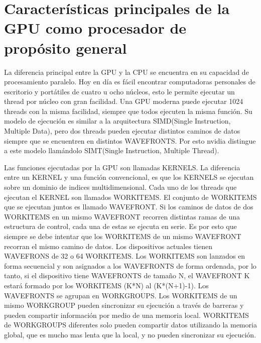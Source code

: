 
\chapter{Características principales de la GPU como procesador de propósito
general}

La diferencia principal entre la GPU y la CPU se encuentra en su capacidad de
procesamiento paralelo. Hoy en día es fácil encontrar computadoras personales de
escritorio y portátiles de cuatro u ocho núcleos, esto le permite ejecutar un
thread por núcleo con gran facilidad. Una GPU moderna puede ejecutar 1024
threads con la misma facilidad, siempre que todos ejecuten la misma función. Su
modelo de ejecución es similar a la arquitectura SIMD(Single Instruction,
Multiple Data), pero dos threads pueden ejecutar distintos caminos de datos
siempre que se encuentren en distintos WAVEFRONTS. Por esto nvidia distingue a
este modelo llamándolo SIMT(Single Instruction, Multiple Thread).

Las funciones ejecutadas por la GPU son llamadas KERNELS. La diferencia entre un
KERNEL y una función convencional, es que los KERNELS se ejecutan sobre un
dominio de indices multidimensional. Cada uno de los threads que ejecutan el
KERNEL son llamados WORKITEMS. El conjunto de WORKITEMS que se ejecutan juntos
es llamado WAVEFRONT. Si los caminos de datos de dos WORKITEMS en un mismo
WAVEFRONT recorren distintas ramas de una estructura de control, cada una de
estas se ejecuta en serie. Es por esto que siempre se debe intentar que los
WORKITEMS de un mismo WAVEFRONT recorran el mismo camino de datos. Los
dispositivos actuales tienen WAVEFRONS de 32 o 64 WORKITEMS. Los WORKITEMS son
lanzados en forma secuencial y son asignados a los WAVEFRONTS de forma ordenada,
por lo tanto, si el dispositivo tiene WAVEFRONTS de tamaño N, el WAVEFRONT K
estará formado por los WORKITEMS (K*N) al (K*(N+1)-1). Los WAVEFRONTS se agrupan
en WORKGROUPS. Los WORKITEMS de un mismo WORKGROUP pueden sincronizar su
ejecución a través de barreras y pueden compartir información por medio de una
memoria local. WORKITEMS de WORKGROUPS diferentes solo pueden compartir datos
utilizando la memoria global, que es mucho mas lenta que la local, y no pueden
sincronizar su ejecución.

